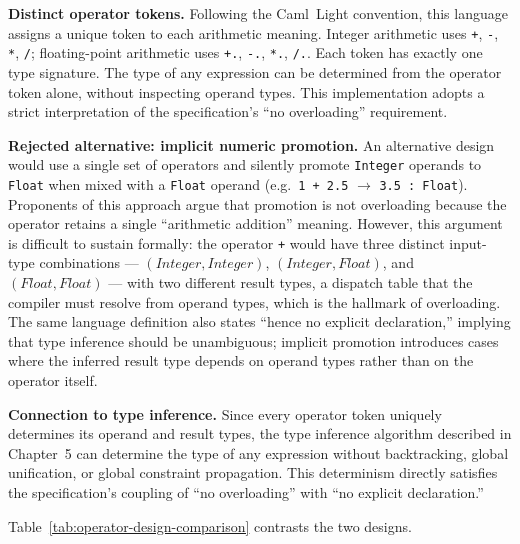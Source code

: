 \textbf{Distinct operator tokens.}
Following the Caml~Light convention, this language assigns a unique token to
each arithmetic meaning. Integer arithmetic uses \texttt{+}, \texttt{-},
\texttt{*}, \texttt{/}; floating-point arithmetic uses \texttt{+.},
\texttt{-.}, \texttt{*.}, \texttt{/.}. Each token has exactly one type
signature. The type of any expression can be determined from the operator token
alone, without inspecting operand types. This implementation adopts a strict
interpretation of the specification's ``no overloading'' requirement.

\textbf{Rejected alternative: implicit numeric promotion.}
An alternative design would use a single set of operators and silently promote
\texttt{Integer} operands to \texttt{Float} when mixed with a \texttt{Float}
operand (e.g.\ \texttt{1 + 2.5} $\rightarrow$ \texttt{3.5 : Float}). Proponents
of this approach argue that promotion is not overloading because the operator
retains a single ``arithmetic addition'' meaning. However, this argument is
difficult to sustain formally: the operator \texttt{+} would have three distinct
input-type combinations --- $(\textit{Integer}, \textit{Integer})$,
$(\textit{Integer}, \textit{Float})$, and $(\textit{Float}, \textit{Float})$ ---
with two different result types, a dispatch table that the compiler must resolve
from operand types, which is the hallmark of overloading. The same language
definition also states ``hence no explicit declaration,'' implying that type
inference should be unambiguous; implicit promotion introduces cases where the
inferred result type depends on operand types rather than on the operator itself.

\textbf{Connection to type inference.}
Since every operator token uniquely determines its operand and result types,
the type inference algorithm described in Chapter~5 can determine the type of
any expression without backtracking, global unification, or global constraint
propagation. This
determinism directly satisfies the specification's coupling of ``no
overloading'' with ``no explicit declaration.''

Table~\ref{tab:operator-design-comparison} contrasts the two designs.

